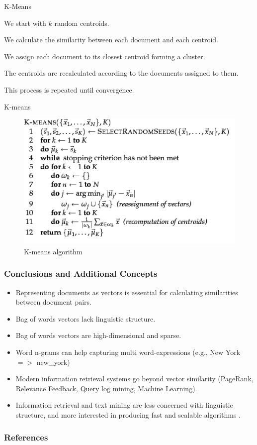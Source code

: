 \documentclass[handout]{beamer}
\begin{document}
\begin{frame}{K-Means}
\footnotesize{
    \begin{enumerate}
    \footnotesize{
    \item We start with $k$ random centroids.
    \item We calculate the similarity between each document and each centroid.
    \item We assign each document to its closest centroid forming a cluster.
    \item The centroids are recalculated according to the documents assigned to them.
    \item This process is repeated until convergence.}
    \end{enumerate}

}
\end{frame}


\begin{frame}{K-means}
\begin{figure}[h!]
	\centering
	\includegraphics[scale=0.6]{pics/kmeans.png}
	\caption{ K-means algorithm}
\end{figure}

 
\end{frame}

\begin{frame}\frametitle{Conclusions and Additional Concepts}
\footnotesize{
\begin{itemize}
 \item Representing documents as vectors is essential for calculating similarities between document pairs.
 \item Bag of words vectors lack linguistic structure.
 \item Bag of words vectors are high-dimensional and sparse. 
 \item Word n-grams can help capturing multi word-expressions (e.g., New York $=>$ new\_york)
 \item Modern information retrieval systems go beyond vector similarity (PageRank, Relevance Feedback, Query log mining,  Machine Learning).
 \item Information retrieval and text mining are less concerned with linguistic structure, and more interested in producing fast and scalable algorithms \cite{jacobbook}. 
\end{itemize}


}
\end{frame}



\begin{frame}[allowframebreaks]\scriptsize
\frametitle{References}


%
\end{frame}



\end{document}
